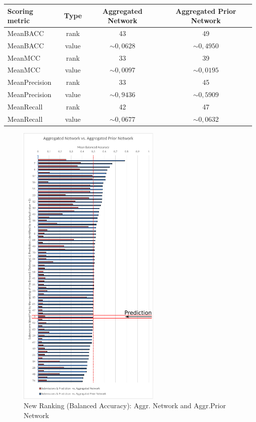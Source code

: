 \begin{table}[H]
\begin{center}
\small
\begin{tabular}{l|c|c|c}
\toprule 
\textbf{Scoring metric} &\textbf{Type} & \textbf{Aggregated Network} & \textbf{Aggregated Prior Network}\\
 \hline\hline
MeanBACC & rank & 43 & 49\\
\rowcolor{black!10} MeanBACC & value & $\sim 0,0628$ &$\sim 0,4950$\\
MeanMCC & rank & 33 & 39\\
\rowcolor{black!10} MeanMCC & value &$ \sim 0,0097$ &$ \sim 0,0195$\\
MeanPrecision & rank & 33 & 45 \\
\rowcolor{black!10} MeanPrecision & value & $\sim 0,9436$& $\sim 0,5909$\\
MeanRecall & rank &42 & 47\\
\rowcolor{black!10} MeanRecall & value & $\sim0,0677$ & $\sim 0,0632$\\
\bottomrule
\end{tabular}
\end{center}
\end{table} 

\begin{figure}[H]
\centering
\includegraphics[width=0.62\textwidth]{./Bilder/Scoring/dreamchallenge/Meanbacc_vertical_comparison.pdf}
\caption[New Ranking Balanced Accuracy]{New Ranking (Balanced Accuracy): Aggr. Network and Aggr.Prior Network}
\label{fig:}
\end{figure}

